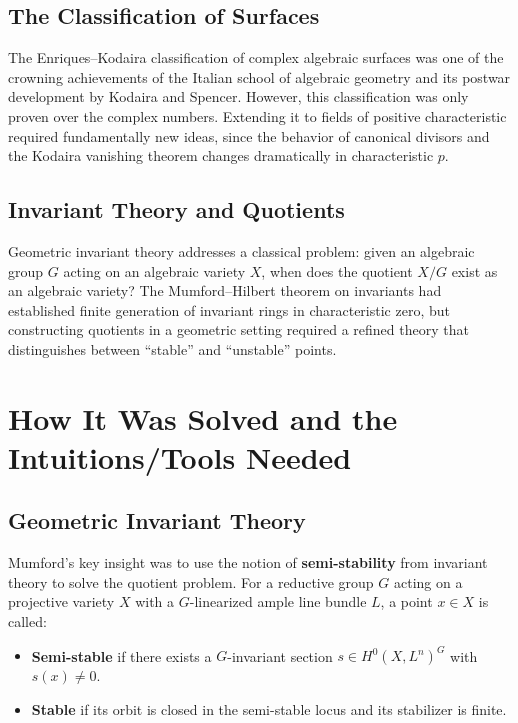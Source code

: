 \subsection{The Classification of Surfaces}

The Enriques--Kodaira classification of complex algebraic surfaces was one of the crowning achievements of the Italian school of algebraic geometry and its postwar development by Kodaira and Spencer. However, this classification was only proven over the complex numbers. Extending it to fields of positive characteristic required fundamentally new ideas, since the behavior of canonical divisors and the Kodaira vanishing theorem changes dramatically in characteristic $p$.

\subsection{Invariant Theory and Quotients}

Geometric invariant theory addresses a classical problem: given an algebraic group $G$ acting on an algebraic variety $X$, when does the quotient $X/G$ exist as an algebraic variety? The Mumford--Hilbert theorem on invariants had established finite generation of invariant rings in characteristic zero, but constructing quotients in a geometric setting required a refined theory that distinguishes between ``stable'' and ``unstable'' points.

\section{How It Was Solved and the Intuitions/Tools Needed}

\subsection{Geometric Invariant Theory}

Mumford's key insight was to use the notion of \textbf{semi-stability} from invariant theory to solve the quotient problem. For a reductive group $G$ acting on a projective variety $X$ with a $G$-linearized ample line bundle $L$, a point $x \in X$ is called:
\begin{itemize}
    \item \textbf{Semi-stable} if there exists a $G$-invariant section $s \in H^0(X, L^n)^G$ with $s(x) \neq 0$.
    \item \textbf{Stable} if its orbit is closed in the semi-stable locus and its stabilizer is finite.
\end{itemize}

